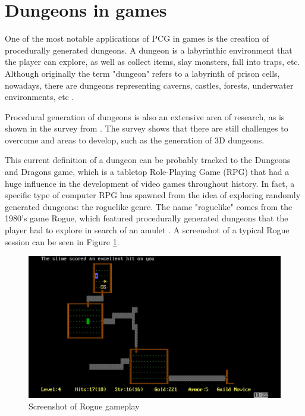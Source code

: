 \section{Dungeons in games}

One of the most notable applications of PCG in games is the creation of procedurally generated dungeons. A dungeon is a labyrinthic environment that the player can explore, as well as collect items, slay monsters, fall into traps, etc. Although originally the term "dungeon" refers to a labyrinth of prison cells, nowadays, there are dungeons representing caverns, castles, forests, underwater environments, etc \cite{shaker:2016}. 

Procedural generation of dungeons is also an extensive area of research, as is shown in the survey from \textcite{viana:2019}. The survey shows that there are still challenges to overcome and areas to develop, such as the generation of 3D dungeons.

This current definition of a dungeon can be probably tracked to the Dungeons and Dragons game, which is a tabletop Role-Playing Game (RPG) that had a huge influence in the development of video games throughout history. In fact, a specific type of computer RPG has spawned from the idea of exploring randomly generated dungeons: the roguelike genre. The name "roguelike" comes from the 1980's game Rogue, which featured procedurally generated dungeons that the player had to explore in search of an amulet \cite{brewer:2016}. A screenshot of a typical Rogue session can be seen in Figure \ref{fig:rogue}.

\begin{figure}[h]
    \caption{Screenshot of Rogue gameplay}
    \centerline{\includegraphics[width=13cm]{images/introduction/rogue.jpg}}
    \label{fig:rogue}
\end{figure}

